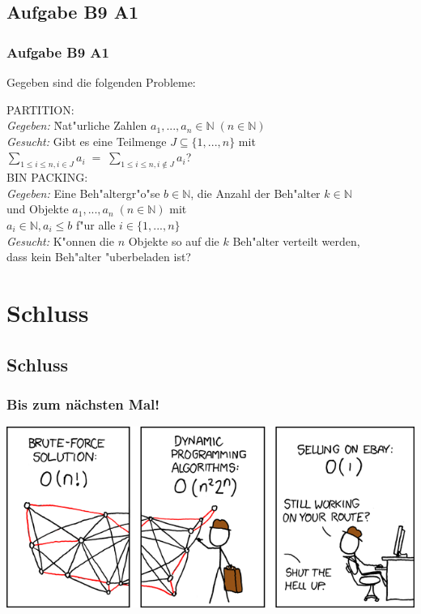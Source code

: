 \subsection{Aufgabe B9 A1}
\begin{frame}
	\frametitle{Aufgabe B9 A1}
	Gegeben sind die folgenden Probleme:
	\begin{tabbing}
	PARTITION:\\
	\textit{Gegeben:} \= Nat"urliche Zahlen $a_1,...,a_n \in \mathbb{N} \; (n \in
	\mathbb{N})$\\
	\textit{Gesucht:} \> Gibt es eine Teilmenge $J \subseteq \{1,...,n\}$ mit\\
	\> $\sum\limits_{1 \leq i \leq n, i \in J}a_i \; = \;
	\sum\limits_{1 \leq i \leq n, i \notin J}a_i$?\\[8pt]
	BIN PACKING:\\
	\textit{Gegeben:} \> Eine Beh"altergr"o"se $b \in \mathbb{N}$, die Anzahl der
	Beh"alter $k \in \mathbb{N}$\\
	\> und Objekte $a_1,...,a_n \; (n \in \mathbb{N})$ mit\\
	\> $a_i \in \mathbb{N}, a_i \leq b$ f"ur alle $i \in \{1,...,n\}$\\
	\textit{Gesucht:} \> K"onnen die $n$ Objekte so auf die $k$ Beh"alter verteilt
	werden,\\
	\> dass kein Beh"alter "uberbeladen ist?\\
	\end{tabbing}
\end{frame}

\section{Schluss}
\subsection{Schluss}
\begin{frame}
\frametitle{Bis zum nächsten Mal!}
\begin{center}
	\includegraphics[width= \textwidth]{images/399_traveling_salesman}
\end{center}
\end{frame}

